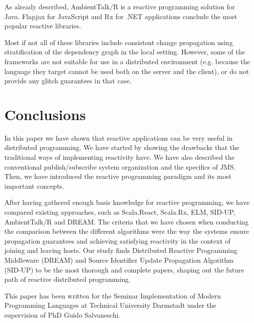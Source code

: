 \documentclass{sigplanconf}
\begin{document}
As already described, AmbientTalk/R is a reactive programming solution for Java. Flapjax \cite{javascript} for JavaScript and Rx \cite{netrx} for .NET applications conclude the most popular reactive libraries.

Most if not all of these libraries include consistent change propagation using  stratification of the dependency graph in the local setting. However, some of the frameworks are not suitable for use in a distributed environment (e.g. because the language they target cannot be used both on the server and the client), or do not provide any glitch guarantees in that case. 

\section{Conclusions}
In this paper we have shown that reactive applications can be very useful in distributed programming. We have started by showing the drawbacks that the traditional ways of implementing reactivity have. We have also described the conventional publish/subscribe system organization and the specifics of JMS. Then, we have introduced the reactive programming paradigm and its most important concepts.

After having gathered enough basis knowledge for reactive programming, we have compared existing approaches, such as Scala.React, Scala.Rx, ELM, SID-UP, AmbientTalk/R and DREAM. The criteria that we have chosen when conducting the comparison between the different algorithms were the way the systems ensure propagation guarantees and achieving satisfying reactivity in the context of joining and leaving hosts. Our study finds Distributed Reactive Programming Middleware (DREAM) and Source Identifier Update Propagation Algorithm (SID-UP) to be the most thorough and complete papers, shaping out the future path of reactive distributed programming.



\acks

This paper has been written for the Seminar Implementation of Modern Programming Languages at Technical University Darmstadt under the supervision of PhD Guido Salvaneschi.

\end{document}
